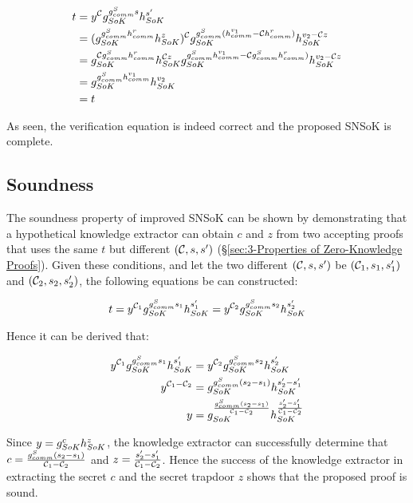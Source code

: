 \begin{equation*}
	\begin{split}
	t &= y^{\mathcal{C}}g_{SoK}^{g_{comm}^{S}s}h_{SoK}^{s'} \\
	&= (g_{SoK}^{g_{comm}^{S}h_{comm}^{r}}h_{SoK}^{z})^{\mathcal{C}}g_{SoK}^{g_{comm}^{S}(h_{comm}^{v_1}-\mathcal{C}h_{comm}^{r})}h_{SoK}^{v_2-\mathcal{C} z} \\
	&= g_{SoK}^{\mathcal{C}g_{comm}^{S}h_{comm}^{r}}h_{SoK}^{\mathcal{C} z}g_{SoK}^{g_{comm}^{S}h_{comm}^{v_1}-\mathcal{C}g_{comm}^{S}h_{comm}^{r})}h_{SoK}^{v_2-\mathcal{C} z} \\
	&= g_{SoK}^{g_{comm}^{S}h_{comm}^{v_1}}h_{SoK}^{v_2} \\
	&= t
	\end{split}
\end{equation*}

As seen, the verification equation is indeed correct and the proposed SNSoK is complete.

\subsection{Soundness}
The soundness property of improved SNSoK can be shown by demonstrating that a hypothetical knowledge extractor can obtain $c$ and $z$ from two accepting proofs that uses the same $t$ but different $(\mathcal{C},s,s')$ (\S\ref{sec:3-Properties of Zero-Knowledge Proofs}). Given these conditions, and let the two different $(\mathcal{C},s,s')$ be $(\mathcal{C}_1,s_1,s'_1)$ and $(\mathcal{C}_2,s_2,s'_2)$, the following equations be can constructed:

$$t=y^{\mathcal{C}_1}g_{SoK}^{g_{comm}^{S}s_1}h_{SoK}^{s'_1}=y^{\mathcal{C}_2}g_{SoK}^{g_{comm}^{S}s_2}h_{SoK}^{s'_2}$$

Hence it can be derived that:

\begin{align*}
y^{\mathcal{C}_{1}}g_{SoK}^{g_{comm}^{S}s_{1}}h_{SoK}^{s'_{1}} &= y^{\mathcal{C}_{2}}g_{SoK}^{g_{comm}^{S}s_{2}}h_{SoK}^{s'_{2}} \\
y^{\mathcal{C}_{1}-\mathcal{C}_{2}} &= g_{SoK}^{g_{comm}^{S}(s_{2}-s_{1})}h_{SoK}^{s'_{2}-s'_{1}} \\
y &= g_{SoK}^{\frac{g_{comm}^{S}(s_2-s_1)}{\mathcal{C}_1-\mathcal{C}_2}}h_{SoK}^{\frac{s'_2-s'_1}{\mathcal{C}_1-\mathcal{C}_2}}
\end{align*}


Since $y=g_{SoK}^{c}h_{SoK}^{z}$, the knowledge extractor can successfully determine that $c=\frac{g_{comm}^{S}(s_2-s_1)}{\mathcal{C}_1-\mathcal{C}_2}$ and $z=\frac{s'_2-s'_1}{\mathcal{C}_1-\mathcal{C}_2}$. Hence the success of the knowledge extractor in extracting the secret \kwCoin{} $c$ and the secret trapdoor $z$ shows that the proposed proof is sound.

